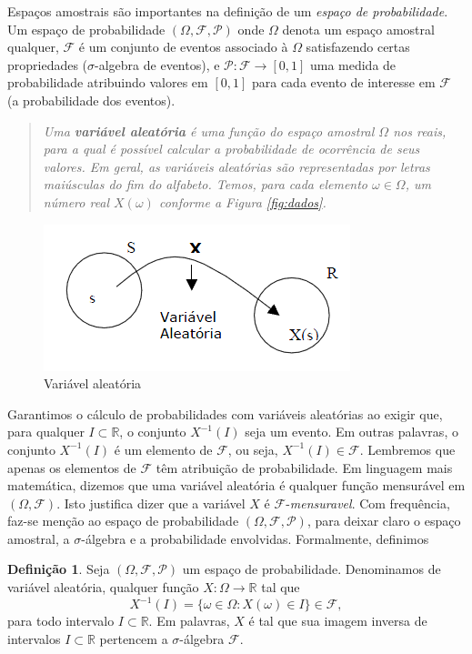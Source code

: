 \documentclass[
]{book}
\theoremstyle{definition}
\newtheorem{definition}{Definição}[chapter]
\theoremstyle{definition}
\theoremstyle{definition}
\theoremstyle{remark}
\begin{document}
Espaços amostrais são importantes na definição de um \emph{espaço de probabilidade}. Um espaço de probabilidade \((\Omega, \mathcal{F},\mathcal{P})\) onde \(\Omega\) denota um espaço amostral qualquer, \(\mathcal{F}\) é um conjunto de eventos associado à \(\Omega\) satisfazendo certas propriedades (\(\sigma\)-algebra de eventos), e \(\mathcal{P}:\mathcal{F}\rightarrow[0,1]\) uma medida de probabilidade atribuindo valores em \([0,1]\) para cada evento de interesse em \(\mathcal{F}\) (a probabilidade dos eventos).

\begin{quote}
\emph{Uma \textbf{variável aleatória} é uma função do espaço amostral
\(\Omega\) nos reais, para a qual é possível calcular a
probabilidade de ocorrência de seus valores. Em geral, as
variáveis aleatórias são representadas por letras maiúsculas do
fim do alfabeto. Temos, para cada elemento \(\omega \in \Omega\), um
número real \(X(\omega)\) conforme a Figura \ref{fig:dados}.}
\end{quote}

\begin{figure}

{\centering \includegraphics[width=0.33\linewidth]{Figuras/VA} 

}

\caption{Variável aleatória}\label{fig:va}
\end{figure}

Garantimos o cálculo de probabilidades com variáveis aleatórias ao exigir que, para qualquer \(I \subset \mathbb{R}\), o conjunto \(X^{-1}(I)\) seja um evento. Em outras palavras, o conjunto \(X^{-1}(I)\) é um
elemento de \(\mathcal{F}\), ou seja, \(X^{-1}(I) \in \mathcal{F}\). Lembremos que apenas os elementos de
\(\mathcal{F}\) têm atribuição de probabilidade. Em linguagem mais matemática, dizemos que uma variável aleatória é qualquer função mensurável em \((\Omega,\mathcal{F})\). Isto justifica dizer que a
variável \(X\) é \(\mathcal{F}\)-\emph{mensuravel}. Com frequência, faz-se menção ao espaço de probabilidade \((\Omega, \mathcal{F},\mathcal{P})\), para deixar claro o espaço amostral, a \(\sigma\)-álgebra e a probabilidade envolvidas. Formalmente, definimos

\begin{definition}
\protect\hypertarget{def:Def1}{}{\label{def:Def1} }Seja \((\Omega, \mathcal{F}, \mathcal{P})\) um espaço de
probabilidade. Denominamos de variável aleatória, qualquer função
\(X:\Omega \rightarrow \mathbb{R}\) tal que
\begin{equation*}
    X^{-1}(I)=\{\omega \in \Omega : X(\omega) \in I\} \in
    \mathcal{F},
\end{equation*}
para todo intervalo \(I \subset \mathbb{R}\). Em palavras, \(X\) é tal que sua
imagem inversa de intervalos \(I \subset \mathbb{R}\) pertencem a
\(\sigma\)-álgebra \(\mathcal{F}\).
\end{definition}
\end{document}
